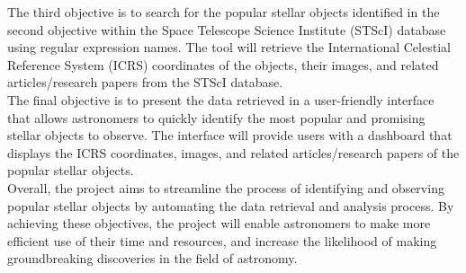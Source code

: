 \documentclass[12pt,letterpaper]{article}
\begin{document}
\quad The third objective is to search for the popular stellar objects identified in 
the second objective within the Space Telescope Science Institute (STScI) database 
using regular expression names. The tool will retrieve the  International 
Celestial Reference System (ICRS) coordinates of the objects, their images, 
and related articles/research papers from the STScI database.\\

\quad The final objective is to present the data retrieved in a user-friendly interface 
that allows astronomers to quickly identify the most popular and promising stellar 
objects to observe. The interface will provide users with a dashboard that displays 
the ICRS coordinates, images, and related articles/research papers of the popular 
stellar objects.\\

\quad Overall, the project aims to streamline the process of identifying and observing 
popular stellar objects by automating the data retrieval and analysis process. 
By achieving these objectives, the project will enable astronomers to make more 
efficient use of their time and resources, and increase the likelihood of making 
groundbreaking discoveries in the field of astronomy.\\
\end{document}
